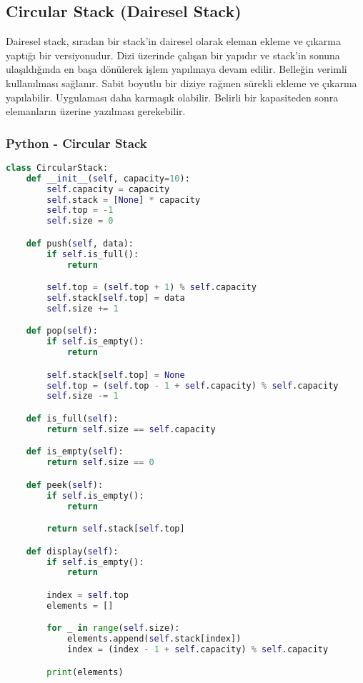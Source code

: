 \subsection{Circular Stack (Dairesel Stack)}

Dairesel stack, sıradan bir stack’in dairesel olarak eleman ekleme ve çıkarma yaptığı bir versiyonudur. Dizi üzerinde çalışan bir yapıdır ve stack’in sonuna ulaşıldığında en başa dönülerek işlem yapılmaya devam edilir. Belleğin verimli kullanılması sağlanır. Sabit boyutlu bir diziye rağmen sürekli ekleme ve çıkarma yapılabilir. Uygulaması daha karmaşık olabilir. Belirli bir kapasiteden sonra elemanların üzerine yazılması gerekebilir.

\subsubsection{Python - Circular Stack}

\begin{lstlisting}[language=Python]
class CircularStack:
    def __init__(self, capacity=10):
        self.capacity = capacity
        self.stack = [None] * capacity
        self.top = -1
        self.size = 0

    def push(self, data):
        if self.is_full():
            return

        self.top = (self.top + 1) % self.capacity
        self.stack[self.top] = data
        self.size += 1

    def pop(self):
        if self.is_empty():
            return

        self.stack[self.top] = None
        self.top = (self.top - 1 + self.capacity) % self.capacity
        self.size -= 1

    def is_full(self):
        return self.size == self.capacity

    def is_empty(self):
        return self.size == 0

    def peek(self):
        if self.is_empty():
            return

        return self.stack[self.top]

    def display(self):
        if self.is_empty():
            return

        index = self.top
        elements = []

        for _ in range(self.size):
            elements.append(self.stack[index])
            index = (index - 1 + self.capacity) % self.capacity

        print(elements)
\end{lstlisting}

